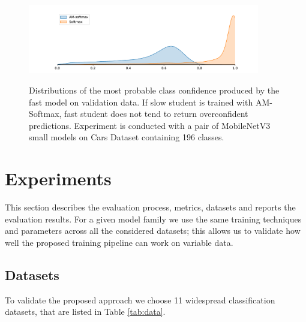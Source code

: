 \documentclass[runningheads]{llncs}
\begin{document}
\begin{figure}[t]
  \centering
  {\includegraphics[width=0.9\textwidth]{img/ams/am_dsit.pdf}}
  \caption{Distributions of the most probable class confidence produced by the fast model on validation data. If
  slow student is trained with AM-Softmax, fast student does not tend to return overconfident predictions. Experiment is
  conducted with a pair of MobileNetV3 small models on Cars Dataset \cite{KrauseStarkDengFei-Fei_3DRR2013} containing 196 classes.}
  \label{fig:dist}
\end{figure}

\section{Experiments}
This section describes the evaluation process, metrics, datasets and reports the evaluation results. For a given model family we use the
same training techniques and parameters across all the considered datasets;
this allows us to validate how well the proposed training pipeline can work on variable data.

\subsection{Datasets}
To validate the proposed approach we choose 11 widespread classification datasets, that are listed
in Table \ref{tab:data}.
\end{document}
